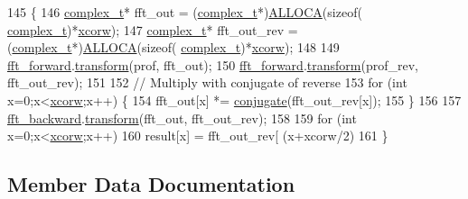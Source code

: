 \begin{DoxyCode}
145 \{
146     \hyperlink{scalar__types_8h_abaffcd8bea58063cc6c608dda082ad05}{complex\_t}* fft\_out = (\hyperlink{scalar__types_8h_abaffcd8bea58063cc6c608dda082ad05}{complex\_t}*)\hyperlink{std__incl_8h_a72fc0ed307a114ba9a46ebd095267d2f}{ALLOCA}(\textcolor{keyword}{sizeof}(
      \hyperlink{scalar__types_8h_abaffcd8bea58063cc6c608dda082ad05}{complex\_t})*\hyperlink{class_x_cor1_d_buffer_a3a5d68c065a62d412b4d615647b30788}{xcorw});
147     \hyperlink{scalar__types_8h_abaffcd8bea58063cc6c608dda082ad05}{complex\_t}* fft\_out\_rev = (\hyperlink{scalar__types_8h_abaffcd8bea58063cc6c608dda082ad05}{complex\_t}*)\hyperlink{std__incl_8h_a72fc0ed307a114ba9a46ebd095267d2f}{ALLOCA}(\textcolor{keyword}{sizeof}(
      \hyperlink{scalar__types_8h_abaffcd8bea58063cc6c608dda082ad05}{complex\_t})*\hyperlink{class_x_cor1_d_buffer_a3a5d68c065a62d412b4d615647b30788}{xcorw});
148 
149     \hyperlink{class_x_cor1_d_buffer_ab7aa1608417f91f44fdc4acc963e6d3b}{fft\_forward}.\hyperlink{classkissfft_ad2db80b9c9b087fb36fbe8b3b0078df8}{transform}(prof, fft\_out);
150     \hyperlink{class_x_cor1_d_buffer_ab7aa1608417f91f44fdc4acc963e6d3b}{fft\_forward}.\hyperlink{classkissfft_ad2db80b9c9b087fb36fbe8b3b0078df8}{transform}(prof\_rev, fft\_out\_rev);
151 
152     \textcolor{comment}{// Multiply with conjugate of reverse}
153     \textcolor{keywordflow}{for} (\textcolor{keywordtype}{int} x=0;x<\hyperlink{class_x_cor1_d_buffer_a3a5d68c065a62d412b4d615647b30788}{xcorw};x++) \{
154         fft\_out[x] *= \hyperlink{cpu__tracker_8cpp_acbdcd9cf414b5dca4a7c2b9cae44832c}{conjugate}(fft\_out\_rev[x]);
155     \}
156 
157     \hyperlink{class_x_cor1_d_buffer_afc27a4abe914d01397a98e174983916a}{fft\_backward}.\hyperlink{classkissfft_ad2db80b9c9b087fb36fbe8b3b0078df8}{transform}(fft\_out, fft\_out\_rev);
158 
159     \textcolor{keywordflow}{for} (\textcolor{keywordtype}{int} x=0;x<\hyperlink{class_x_cor1_d_buffer_a3a5d68c065a62d412b4d615647b30788}{xcorw};x++)
160         result[x] = fft\_out\_rev[ (x+xcorw/2) %
161 \}
\end{DoxyCode}


\subsection{Member Data Documentation}
